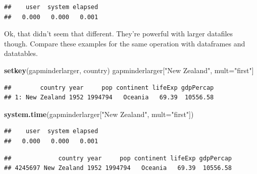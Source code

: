 \documentclass[]{article}
\newenvironment{Shaded}{\begin{snugshade}}{\end{snugshade}}
\newcommand{\KeywordTok}[1]{\textcolor[rgb]{0.13,0.29,0.53}{\textbf{{#1}}}}
\newcommand{\DataTypeTok}[1]{\textcolor[rgb]{0.13,0.29,0.53}{{#1}}}
\newcommand{\DecValTok}[1]{\textcolor[rgb]{0.00,0.00,0.81}{{#1}}}
\newcommand{\StringTok}[1]{\textcolor[rgb]{0.31,0.60,0.02}{{#1}}}
\newcommand{\NormalTok}[1]{{#1}}
\begin{document}
\begin{verbatim}
##    user  system elapsed 
##   0.000   0.000   0.001
\end{verbatim}

Ok, that didn't seem that different. They're powerful with larger
datafiles though. Compare these examples for the same operation with
dataframes and datatables.

\begin{Shaded}
\begin{Highlighting}[]
\KeywordTok{setkey}\NormalTok{(gapminderlarger, country)}
\NormalTok{gapminderlarger[}\StringTok{"New Zealand"}\NormalTok{, mult=}\StringTok{"first"}\NormalTok{] }
\end{Highlighting}
\end{Shaded}

\begin{verbatim}
##        country year     pop continent lifeExp gdpPercap
## 1: New Zealand 1952 1994794   Oceania   69.39  10556.58
\end{verbatim}

\begin{Shaded}
\begin{Highlighting}[]
\KeywordTok{system.time}\NormalTok{(gapminderlarger[}\StringTok{"New Zealand"}\NormalTok{, }\DataTypeTok{mult=}\StringTok{"first"}\NormalTok{])}
\end{Highlighting}
\end{Shaded}

\begin{verbatim}
##    user  system elapsed 
##   0.000   0.000   0.001
\end{verbatim}

\begin{Shaded}
\end{Shaded}

\begin{verbatim}
##             country year     pop continent lifeExp gdpPercap
## 4245697 New Zealand 1952 1994794   Oceania   69.39  10556.58
\end{verbatim}

\begin{Shaded}
\end{Shaded}
\end{document}
